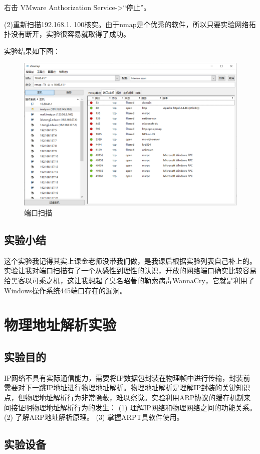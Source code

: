 \documentclass[lang=cn,11pt,a4paper,cite=authoryear]{elegantpaper}
\begin{document}
右击 VMware Anthorization Service->“停止”。

(2)重新扫描192.168.1. 100核实。由于nmap是个优秀的软件，所以只要实验网络拓扑没有断开，实验很容易就取得了成功。

实验结果如下图：

\begin{figure}[htbp]
	\centering
	\includegraphics[width=0.7\linewidth]{image/screenshot010}
	\caption{端口扫描}
	\label{fig:screenshot010}
\end{figure}


\subsection{实验小结}
这个实验我记得其实上课金老师没带我们做，是我课后根据实验列表自己补上的。实验让我对端口扫描有了一个从感性到理性的认识，开放的网络端口确实比较容易给黑客以可乘之机，这让我想起了臭名昭著的勒索病毒WannaCry，它就是利用了Windows操作系统445端口存在的漏洞。
\section{物理地址解析实验}
\subsection{实验目的}
IP网络不具有实际通信能力，需要将IP数据包封装在物理帧中进行传输，封装前需要对下一跳IP地址进行物理地址解析。物理地址解析是理解IP封装的关键知识点，但物理地址解析行为非常隐蔽，难以察觉。实验利用ARP协议的缓存机制来间接证明物理地址解析行为的发生：
(1)	理解IP网络和物理网络之间的功能关系。
(2)	了解ARP地址解析原理。
(3)	掌握ARPT具软件使用。

\subsection{实验设备}
\end{document}
